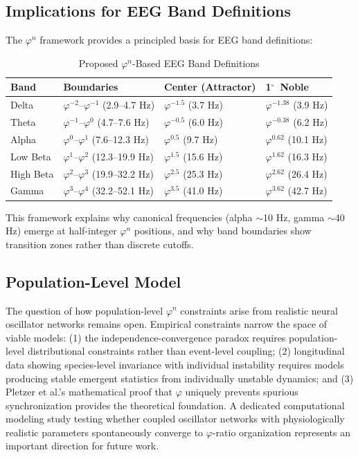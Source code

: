\documentclass[11pt,a4paper]{article}
\newcommand{\degree}{$^\circ$}  %
\newcommand{\phisym}{\varphi}
\begin{document}
\subsection{Implications for EEG Band Definitions}

The $\phisym^n$ framework provides a principled basis for EEG band definitions:

\begin{table}[H]
\centering
\caption{Proposed $\phisym^n$-Based EEG Band Definitions}
\label{tab:band_definitions}
\begin{tabular}{@{}llll@{}}
\toprule
Band & Boundaries & Center (Attractor) & 1\degree\ Noble \\
\midrule
Delta & $\phisym^{-2}$--$\phisym^{-1}$ (2.9--4.7 Hz) & $\phisym^{-1.5}$ (3.7 Hz) & $\phisym^{-1.38}$ (3.9 Hz) \\
Theta & $\phisym^{-1}$--$\phisym^{0}$ (4.7--7.6 Hz) & $\phisym^{-0.5}$ (6.0 Hz) & $\phisym^{-0.38}$ (6.2 Hz) \\
Alpha & $\phisym^{0}$--$\phisym^{1}$ (7.6--12.3 Hz) & $\phisym^{0.5}$ (9.7 Hz) & $\phisym^{0.62}$ (10.1 Hz) \\
Low Beta & $\phisym^{1}$--$\phisym^{2}$ (12.3--19.9 Hz) & $\phisym^{1.5}$ (15.6 Hz) & $\phisym^{1.62}$ (16.3 Hz) \\
High Beta & $\phisym^{2}$--$\phisym^{3}$ (19.9--32.2 Hz) & $\phisym^{2.5}$ (25.3 Hz) & $\phisym^{2.62}$ (26.4 Hz) \\
Gamma & $\phisym^{3}$--$\phisym^{4}$ (32.2--52.1 Hz) & $\phisym^{3.5}$ (41.0 Hz) & $\phisym^{3.62}$ (42.7 Hz) \\
\bottomrule
\end{tabular}
\end{table}

This framework explains why canonical frequencies (alpha $\sim$10 Hz, gamma $\sim$40 Hz) emerge at half-integer $\phisym^n$ positions, and why band boundaries show transition zones rather than discrete cutoffs.

\subsection{Population-Level Model}

The question of how population-level $\phisym^n$ constraints arise from realistic neural oscillator networks remains open. Empirical constraints narrow the space of viable models: (1) the independence-convergence paradox requires population-level distributional constraints rather than event-level coupling; (2) longitudinal data showing species-level invariance with individual instability \parencite{lacy2026lemon} requires models producing stable emergent statistics from individually unstable dynamics; and (3) Pletzer et al.'s \parencite{pletzer2010golden} mathematical proof that $\phisym$ uniquely prevents spurious synchronization provides the theoretical foundation. A dedicated computational modeling study testing whether coupled oscillator networks with physiologically realistic parameters spontaneously converge to $\phisym$-ratio organization represents an important direction for future work.
\end{document}
